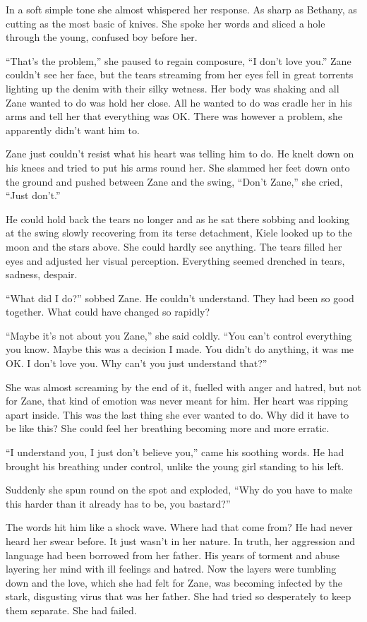 In a soft simple tone she almost whispered her response.  As sharp as Bethany, as cutting as the most basic of knives.  She spoke her words and sliced a hole through the young, confused boy before her.

``That's the problem,'' she paused to regain composure, ``I don't love you.''  Zane couldn't see her face, but the tears streaming from her eyes fell in great torrents lighting up the denim with their silky wetness.  Her body was shaking and all Zane wanted to do was hold her close.  All he wanted to do was cradle her in his arms and tell her that everything was OK.  There was however a problem, she apparently didn't want him to.  

Zane just couldn't resist what his heart was telling him to do.  He knelt down on his knees and tried to put his arms round her.  She slammed her feet down onto the ground and pushed between Zane and the swing, ``Don't Zane,'' she cried, ``Just don't.''

He could hold back the tears no longer and as he sat there sobbing and looking at the swing slowly recovering from its terse detachment, Kiele looked up to the moon and the stars above.  She could hardly see anything.  The tears filled her eyes and adjusted her visual perception.  Everything seemed drenched in tears, sadness, despair.  

``What did I do?'' sobbed Zane.  He couldn't understand.  They had been so good together.  What could have changed so rapidly?  

``Maybe it's not about you Zane,'' she said coldly.  ``You can't control everything you know.  Maybe this was a decision I made.  You didn't do anything, it was me OK.  I don't love you.  Why can't you just understand that?''

She was almost screaming by the end of it, fuelled with anger and hatred, but not for Zane, that kind of emotion was never meant for him.  Her heart was ripping apart inside.  This was the last thing she ever wanted to do.  Why did it have to be like this?  She could feel her breathing becoming more and more erratic.

``I understand you, I just don't believe you,'' came his soothing words.  He had brought his breathing under control, unlike the young girl standing to his left.  

Suddenly she spun round on the spot and exploded, ``Why do you have to make this harder than it already has to be, you bastard?''

The words hit him like a shock wave.  Where had that come from?  He had never heard her swear before.  It just wasn't in her nature.  In truth, her aggression and language had been borrowed from her father.  His years of torment and abuse layering her mind with ill feelings and hatred.  Now the layers were tumbling down and the love, which she had felt for Zane, was becoming infected by the stark, disgusting virus that was her father.  She had tried so desperately to keep them separate.  She had failed.

